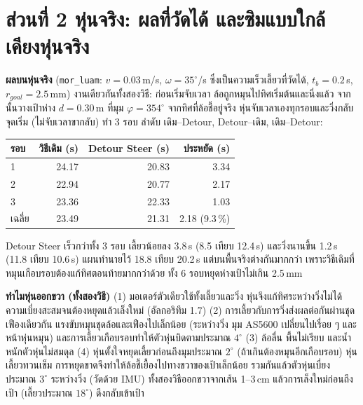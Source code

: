 \documentclass[11pt,a4paper]{article}
\begin{document}
\section*{ส่วนที่ 2 หุ่นจริง: ผลที่วัดได้ และซิมแบบใกล้เคียงหุ่นจริง}
{\small
\noindent\textbf{ผลบนหุ่นจริง} (\texttt{mor\_luam}: $v = 0.03$\,m/s, $\omega = 35^\circ$/s ซึ่งเป็นความเร็วเลี้ยวที่วัดได้,
$t_b = 0.2$\,s, $r_{goal} = 2.5$\,mm) งานเดียวกันทั้งสองวิธี: ก่อนเริ่มจับเวลา ล้อถูกหมุนไปทิศเริ่มต้นและนิ่งแล้ว
จากนั้นวางเป้าห่าง $d = 0.30$\,m ที่มุม $\varphi = 354^\circ$ จากทิศที่ล้อชี้อยู่จริง
หุ่นจับเวลาเองทุกรอบและวิ่งกลับจุดเริ่ม (ไม่จับเวลาขากลับ) ทำ 3 รอบ ลำดับ เดิม--Detour, Detour--เดิม, เดิม--Detour:
\begin{center}
\begin{tabular}{lrrr}
\toprule
รอบ & วิธีเดิม (s) & Detour Steer (s) & ประหยัด (s) \\
\midrule
1 & 24.17 & 20.83 & 3.34 \\
2 & 22.94 & 20.77 & 2.17 \\
3 & 23.36 & 22.33 & 1.03 \\
\midrule
เฉลี่ย & 23.49 & 21.31 & 2.18 (9.3\,\%) \\
\bottomrule
\end{tabular}
\end{center}
\noindent Detour Steer เร็วกว่าทั้ง 3 รอบ เลี้ยวน้อยลง 3.8\,s (8.5 เทียบ 12.4\,s) และวิ่งนานขึ้น 1.2\,s
(11.8 เทียบ 10.6\,s) แผนทำนายไว้ 18.8 เทียบ 20.2\,s แต่บนพื้นจริงต่างกันมากกว่า
เพราะวิธีเดิมที่หมุนเกือบรอบต้องแก้ทิศตอนท้ายมากกว่าด้วย ทั้ง 6 รอบหยุดห่างเป้าไม่เกิน 2.5\,mm

\medskip
\noindent\textbf{ทำไมหุ่นออกขวา (ทั้งสองวิธี)}
(1) มอเตอร์ตัวเดียวใช้ทั้งเลี้ยวและวิ่ง หุ่นจึงแก้ทิศระหว่างวิ่งไม่ได้ ความเบี่ยงสะสมจนต้องหยุดแล้วเล็งใหม่ (อัลกอริทึม 1.7)
(2) การเลี้ยวกับการวิ่งส่งผลต่อกันผ่านชุดเฟืองเดียวกัน แรงขับหมุนชุดล้อและเฟืองไปเล็กน้อย (ระหว่างวิ่ง มุม AS5600 เปลี่ยนไปเรื่อย ๆ และหน้าหุ่นหมุน)
และการเลี้ยวเกือบรอบทำให้ตัวหุ่นบิดตามประมาณ $4^\circ$
(3) ล้อลื่น พื้นไม่เรียบ และน้ำหนักตัวหุ่นไม่สมดุล
(4) หุ่นตั้งใจหยุดเลี้ยวก่อนถึงมุมประมาณ $2^\circ$ (ถ้าเกินต้องหมุนอีกเกือบรอบ)
หุ่นเลี้ยวทวนเข็ม การหยุดขาดจึงทำให้ล้อชี้เยื้องไปทางขวาของเป้าเล็กน้อย
รวมกันแล้วตัวหุ่นเบี่ยงประมาณ $3^\circ$ ระหว่างวิ่ง (วัดด้วย IMU) ทั้งสองวิธีออกขวาจากเส้น 1--3\,cm
แล้วการเล็งใหม่ก่อนถึงเป้า (เลี้ยวประมาณ $18^\circ$) ดึงกลับเข้าเป้า

}
\end{document}
